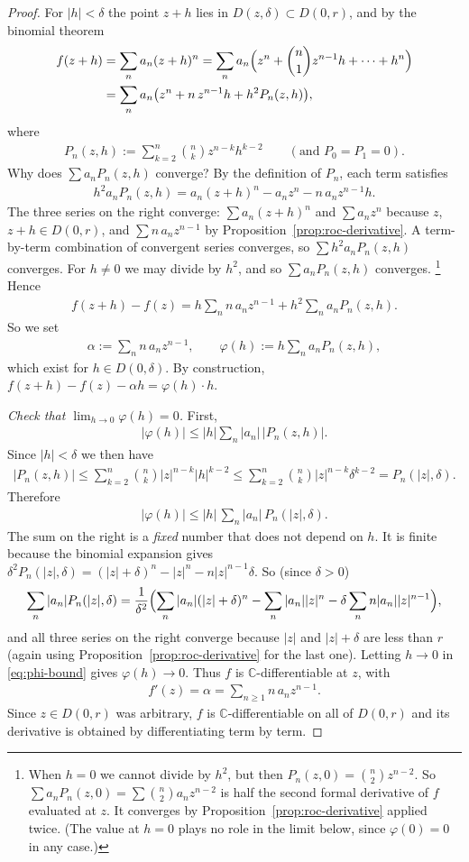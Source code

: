 \documentclass[11pt]{article}
\theoremstyle{plain}
\theoremstyle{definition}
\theoremstyle{remark}
\numberwithin{equation}{section}
\newcommand{\be}{\begin{eqnarray}}
\newcommand{\ee}{\end{eqnarray}}
\newcommand{\C}{\mathbb{C}}
\begin{document}
\begin{proof}
For $|h|<\delta$ the point $z+h$ lies in $D(z,\delta)\subset D(0,r)$, and by
the binomial theorem
\begin{align*}
 f(z+h)&=\sum_n a_n(z+h)^n
 =\sum_n a_n\Bigl(z^n+\binom n1z^{n-1}h+\cdots+h^n\Bigr)\\
 &=\sum_n a_n\bigl(z^n+n\,z^{n-1}h+h^2P_n(z,h)\bigr),
\end{align*}
where
\be
 P_n(z,h):=\sum_{k=2}^{n}\binom nk z^{n-k}h^{k-2}
 \qquad(\text{and }P_0=P_1=0).
\ee
Why does $\sum a_nP_n(z,h)$ converge? By the definition of $P_n$, each
term satisfies
\be
 h^2a_nP_n(z,h)=a_n(z+h)^n-a_nz^n-n\,a_nz^{n-1}h.
\ee
The three series on the right converge: $\sum a_n(z+h)^n$ and $\sum a_nz^n$
because $z$, $z+h\in D(0,r)$, and $\sum n\,a_nz^{n-1}$ by
Proposition~\ref{prop:roc-derivative}. A term-by-term combination of
convergent series converges, so $\sum h^2a_nP_n(z,h)$ converges. For
$h\neq0$ we may divide by $h^2$, and so $\sum a_nP_n(z,h)$ converges.%
\footnote{When $h=0$ we cannot divide by $h^2$, but then
$P_n(z,0)=\binom n2z^{n-2}$. So $\sum a_nP_n(z,0)=\sum\binom n2a_nz^{n-2}$
is half the second formal derivative of $f$ evaluated at $z$. It converges
by Proposition~\ref{prop:roc-derivative} applied twice. (The value at
$h=0$ plays no role in the limit below, since $\varphi(0)=0$ in any case.)}
Hence
\be
 f(z+h)-f(z)=h\sum_n n\,a_nz^{n-1}+h^2\sum_n a_nP_n(z,h).
\ee
So we set
\be
 \alpha:=\sum_n n\,a_nz^{n-1},
 \qquad
 \varphi(h):=h\sum_n a_nP_n(z,h),
\ee
which exist for $h\in D(0,\delta)$. By construction,
$f(z+h)-f(z)-\alpha h=\varphi(h)\cdot h$.

\emph{Check that $\lim_{h\to0}\varphi(h)=0$.} First,
\be
 |\varphi(h)|\leq|h|\sum_n|a_n|\,|P_n(z,h)|.
\ee
Since $|h|<\delta$ we then have
\be
 |P_n(z,h)|\leq\sum_{k=2}^{n}\binom nk|z|^{n-k}|h|^{k-2}
 \leq\sum_{k=2}^{n}\binom nk|z|^{n-k}\delta^{k-2}=P_n(|z|,\delta).
\ee
Therefore
\be
 |\varphi(h)|\leq|h|\,\sum_n|a_n|\,P_n(|z|,\delta).
 \label{eq:phi-bound}
\ee
The sum on the right is a \emph{fixed} number that does not depend on $h$.
It is finite because the binomial expansion gives
$\delta^2P_n(|z|,\delta)=(|z|+\delta)^n-|z|^n-n|z|^{n-1}\delta$. So (since $\delta  >0$)
\be
 \sum_n|a_n|P_n(|z|,\delta)
 =\frac1{\delta^2}\Bigl(\sum_n|a_n|(|z|+\delta)^n-\sum_n|a_n||z|^n
 -\delta\sum_n n|a_n||z|^{n-1}\Bigr),
\ee
and all three series on the right converge because $|z|$ and $|z|+\delta$
are less than $r$ (again using Proposition~\ref{prop:roc-derivative} for
the last one). Letting $h\to0$ in \eqref{eq:phi-bound} gives
$\varphi(h)\to0$. Thus $f$ is $\C$-differentiable at $z$, with
\be
 f'(z)=\alpha=\sum_{n\geq1}n\,a_nz^{n-1}.
\ee
Since $z\in D(0,r)$ was arbitrary, $f$ is $\C$-differentiable on all of
$D(0,r)$ and its derivative is obtained by differentiating term by term.
\end{proof}
\end{document}
